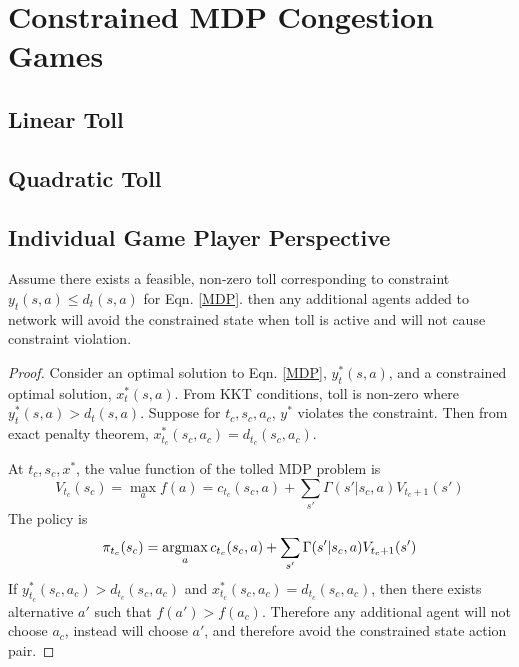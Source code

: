 \section{Constrained MDP Congestion Games}\label{convergence}
\subsection{Linear Toll}

\subsection{Quadratic Toll}
\subsection{Individual Game Player Perspective}
\begin{theorem}
Assume there exists a feasible, non-zero toll corresponding to constraint  $y_t(s,a) \leq d_t(s,a)$ for Eqn. \ref{MDP}. 
then any additional agents added to network will avoid the constrained state when toll is active and will not cause constraint violation. 
\end{theorem}
\begin{proof}
Consider an optimal solution to Eqn. \ref{MDP}, $y_t^*(s,a)$, and a constrained optimal solution, $x_t^*(s,a)$. From KKT conditions, toll is non-zero where $y_t^*(s,a) > d_t(s,a) $. Suppose for $t_c, s_c, a_c $, $y^* $ violates the constraint. Then from exact penalty theorem, $x_{t_c}^*(s_c,a_c) = d_{t_c}(s_c,a_c) $. 


At $t_c, s_c, x^* $, the value function of the tolled MDP problem is
\[
V_{t_c}(s_c)  = \max_a f(a) = c_{t_c}(s_c, a) + \sum_{s'}\Gamma (s' | s_c, a)V_{t_c + 1}(s')
\]
The policy is 
\[
\pi_{t_c}(s_c)  = \mathop{\rm argmax}_a c_{t_c}(s_c, a) + \sum_{s'}\Gamma (s' | s_c, a)V_{t_c + 1}(s')
\]
If $ y_{t_c}^*(s_c,a_c) > d_{t_c}(s_c,a_c) $ and $x_{t_c}^*(s_c,a_c) = d_{t_c}(s_c,a_c) $, then there exists alternative $a' $ such that $f(a') > f(a_c) $. Therefore any additional agent will not choose $a_c $, instead will choose $a' $, and therefore avoid the constrained state action pair. 
\end{proof}